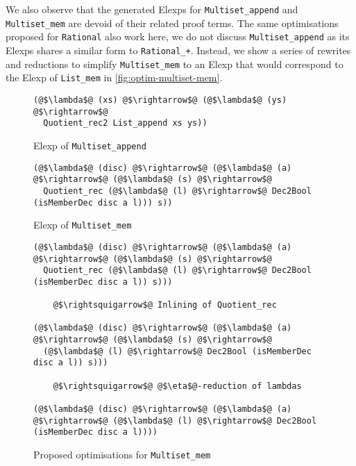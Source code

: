 \documentclass[12pt,twoside,maitrise]{dms}
\theoremstyle{definition}
\numberwithin{equation}{section}
\numberwithin{table}{chapter}
\numberwithin{figure}{chapter}
\newcommand\id[1] {\texttt{#1}}
\begin{document}
We also observe that the generated Elexps for \id{Multiset\_append} and
\id{Multiset\_mem} are devoid of their related proof terms. The same
optimisations proposed for \id{Rational} also work here, we do not discuss
\id{Multiset\_append} as its Elexps shares a similar form to \id{Rational\_+}.
Instead, we show a series of rewrites and reductions to simplify
\id{Multiset\_mem} to an Elexp that would correspond to the Elexp of
\id{List\_mem} in \autoref{fig:optim-multiset-mem}.

\begin{figure}
\begin{verbatim}
(@$\lambda$@ (xs) @$\rightarrow$@ (@$\lambda$@ (ys) @$\rightarrow$@
  Quotient_rec2 List_append xs ys))
\end{verbatim}
\caption{Elexp of \id{Multiset\_append}}
\end{figure}

\begin{figure}
\begin{verbatim}
(@$\lambda$@ (disc) @$\rightarrow$@ (@$\lambda$@ (a) @$\rightarrow$@ (@$\lambda$@ (s) @$\rightarrow$@
  Quotient_rec (@$\lambda$@ (l) @$\rightarrow$@ Dec2Bool (isMemberDec disc a l))) s))
\end{verbatim}
\caption{Elexp of \id{Multiset\_mem}}
\end{figure}

\begin{figure}
\begin{mdframed}
\begin{verbatim}
(@$\lambda$@ (disc) @$\rightarrow$@ (@$\lambda$@ (a) @$\rightarrow$@ (@$\lambda$@ (s) @$\rightarrow$@
  Quotient_rec (@$\lambda$@ (l) @$\rightarrow$@ Dec2Bool (isMemberDec disc a l)) s)))

    @$\rightsquigarrow$@ Inlining of Quotient_rec

(@$\lambda$@ (disc) @$\rightarrow$@ (@$\lambda$@ (a) @$\rightarrow$@ (@$\lambda$@ (s) @$\rightarrow$@
  (@$\lambda$@ (l) @$\rightarrow$@ Dec2Bool (isMemberDec disc a l)) s)))

    @$\rightsquigarrow$@ @$\eta$@-reduction of lambdas

(@$\lambda$@ (disc) @$\rightarrow$@ (@$\lambda$@ (a) @$\rightarrow$@ (@$\lambda$@ (l) @$\rightarrow$@ Dec2Bool (isMemberDec disc a l))))

\end{verbatim}
\end{mdframed}
\caption{Proposed optimisations for \id{Multiset\_mem}}\label{fig:optim-multiset-mem}
\end{figure}
\end{document}
